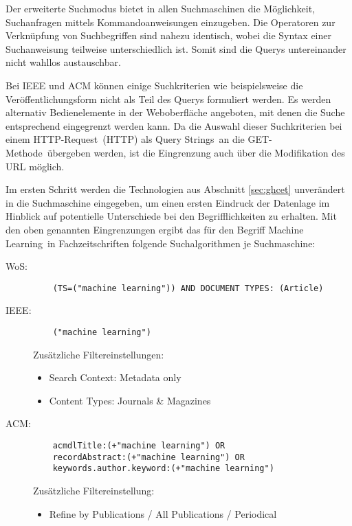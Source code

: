Der erweiterte Suchmodus bietet in allen Suchmaschinen die Möglichkeit, Suchanfragen mittels Kommandoanweisungen einzugeben. Die Operatoren zur Verknüpfung von Suchbegriffen sind nahezu identisch, wobei die Syntax einer Suchanweisung teilweise unterschiedlich ist. Somit sind die Querys untereinander nicht wahllos austauschbar.

Bei \ac{IEEE} und \ac{ACM} können einige Suchkriterien wie beispielsweise die Ver\-öf\-fent\-li\-chungs\-form nicht als Teil des Querys formuliert werden. Es werden alternativ Bedienelemente in der Web\-oberfläche angeboten, mit denen die Suche entsprechend eingegrenzt werden kann. Da die Auswahl dieser Suchkriterien bei einem \glqq\acs{HTTP}-Request\grqq~(\acl{HTTP}) als \glqq Query Strings\grqq~an die \glqq GET-Methode\grqq~übergeben werden, ist die Eingrenzung auch über die Modifikation des \ac{URL} möglich.

Im ersten Schritt werden die Technologien aus Abschnitt \ref{sec:ghcet} unverändert in die Suchmaschine eingegeben, um einen ersten Eindruck der Datenlage im Hinblick auf potentielle Unterschiede bei den Begrifflichkeiten zu erhalten. Mit den oben genannten Eingrenzungen ergibt das für den Begriff \glqq Machine Learning\grqq~in Fachzeitschriften folgende Suchalgorithmen je Suchmaschine:

\begin{description}
	\item [\acs{WoS}:] \begin{verbatim}
	(TS=("machine learning")) AND DOCUMENT TYPES: (Article)
	\end{verbatim}

	\item [\acs{IEEE}:] \begin{verbatim}
	("machine learning")
	\end{verbatim}
	Zusätzliche Filtereinstellungen:
	\begin{itemize}
		\item Search Context: Metadata only
		\item Content Types: Journals \& Magazines
	\end{itemize}

	\item [\acs{ACM}:] \begin{verbatim}
	acmdlTitle:(+"machine learning") OR
	recordAbstract:(+"machine learning") OR
	keywords.author.keyword:(+"machine learning")
	\end{verbatim}
	Zusätzliche Filtereinstellung:
	\begin{itemize}
		\item Refine by Publications / All Publications / Periodical
	\end{itemize}
\end{description}

